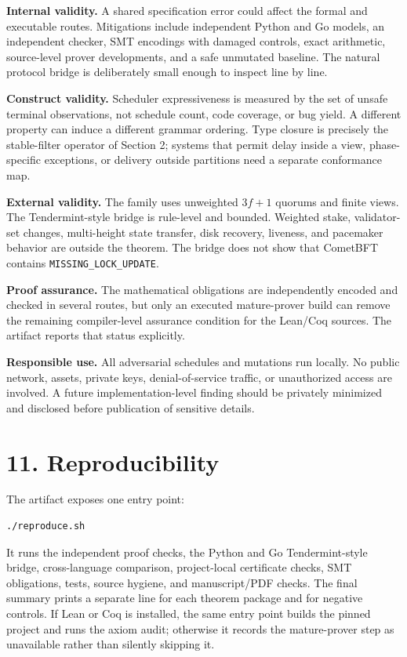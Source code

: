 \textbf{Internal validity.} A shared specification error could affect
the formal and executable routes. Mitigations include independent Python
and Go models, an independent checker, SMT encodings with damaged
controls, exact arithmetic, source-level prover developments, and a safe
unmutated baseline. The natural protocol bridge is deliberately small
enough to inspect line by line.

\textbf{Construct validity.} Scheduler expressiveness is measured by the
set of unsafe terminal observations, not schedule count, code coverage,
or bug yield. A different property can induce a different grammar
ordering. Type closure is precisely the stable-filter operator of
Section 2; systems that permit delay inside a view, phase-specific
exceptions, or delivery outside partitions need a separate conformance
map.

\textbf{External validity.} The family uses unweighted \(3f+1\) quorums
and finite views. The Tendermint-style bridge is rule-level and bounded.
Weighted stake, validator-set changes, multi-height state transfer, disk
recovery, liveness, and pacemaker behavior are outside the theorem. The
bridge does not show that CometBFT contains
\texttt{MISSING\_LOCK\_UPDATE}.

\textbf{Proof assurance.} The mathematical obligations are independently
encoded and checked in several routes, but only an executed
mature-prover build can remove the remaining compiler-level assurance
condition for the Lean/Coq sources. The artifact reports that status
explicitly.

\textbf{Responsible use.} All adversarial schedules and mutations run
locally. No public network, assets, private keys, denial-of-service
traffic, or unauthorized access are involved. A future
implementation-level finding should be privately minimized and disclosed
before publication of sensitive details.

\section{11. Reproducibility}\label{reproducibility}

The artifact exposes one entry point:

\begin{verbatim}
./reproduce.sh
\end{verbatim}

It runs the independent proof checks, the Python and Go Tendermint-style
bridge, cross-language comparison, project-local certificate checks, SMT
obligations, tests, source hygiene, and manuscript/PDF checks. The final
summary prints a separate line for each theorem package and for negative
controls. If Lean or Coq is installed, the same entry point builds the
pinned project and runs the axiom audit; otherwise it records the
mature-prover step as unavailable rather than silently skipping it.

